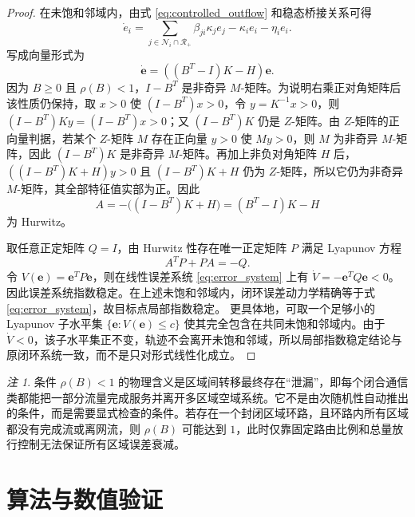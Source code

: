 \documentclass[a4paper,12pt]{article}
\theoremstyle{plain}
\theoremstyle{definition}
\theoremstyle{remark}
\newtheorem{remark}[theorem]{注}
\begin{document}
\begin{proof}
在未饱和邻域内，由式 \eqref{eq:controlled_outflow} 和稳态桥接关系可得
\begin{equation}
    \dot e_i
    =
    \sum_{j\in\mathcal N_i\cap\mathcal R_+}\beta_{ji}\kappa_j e_j-\kappa_i e_i-\eta_i e_i .
\end{equation}
写成向量形式为
\begin{equation}\label{eq:error_system}
    \dot{\bm e}
    =
    \left((B^T-I)K-H\right)\bm e .
\end{equation}
因为 $B\ge0$ 且 $\rho(B)<1$，$I-B^T$ 是非奇异 $M$-矩阵。为说明右乘正对角矩阵后该性质仍保持，取 $x>0$ 使 $(I-B^T)x>0$，令 $y=K^{-1}x>0$，则 $(I-B^T)Ky=(I-B^T)x>0$；又 $(I-B^T)K$ 仍是 $Z$-矩阵。由 $Z$-矩阵的正向量判据，若某个 $Z$-矩阵 $M$ 存在正向量 $y>0$ 使 $My>0$，则 $M$ 为非奇异 $M$-矩阵，因此 $(I-B^T)K$ 是非奇异 $M$-矩阵。再加上非负对角矩阵 $H$ 后，$((I-B^T)K+H)y>0$ 且 $(I-B^T)K+H$ 仍为 $Z$-矩阵，所以它仍为非奇异 $M$-矩阵，其全部特征值实部为正。因此
\[
    A=-\bigl((I-B^T)K+H\bigr)=(B^T-I)K-H
\]
为 Hurwitz。

取任意正定矩阵 $Q=I$，由 Hurwitz 性存在唯一正定矩阵 $P$ 满足 Lyapunov 方程
\begin{equation}
    A^TP+PA=-Q .
\end{equation}
令 $V(\bm e)=\bm e^TP\bm e$，则在线性误差系统 \eqref{eq:error_system} 上有 $\dot V=-\bm e^TQ\bm e<0$。因此误差系统指数稳定。在上述未饱和邻域内，闭环误差动力学精确等于式 \eqref{eq:error_system}，故目标点局部指数稳定。
更具体地，可取一个足够小的 Lyapunov 子水平集 $\{\bm e:V(\bm e)\le c\}$ 使其完全包含在共同未饱和邻域内。由于 $\dot V<0$，该子水平集正不变，轨迹不会离开未饱和邻域，所以局部指数稳定结论与原闭环系统一致，而不是只对形式线性化成立。
\end{proof}

\begin{remark}
条件 $\rho(B)<1$ 的物理含义是区域间转移最终存在“泄漏”，即每个闭合通信类都能把一部分流量完成服务并离开多区域空域系统。它不是由次随机性自动推出的条件，而是需要显式检查的条件。若存在一个封闭区域环路，且环路内所有区域都没有完成流或离网流，则 $\rho(B)$ 可能达到 $1$，此时仅靠固定路由比例和总量放行控制无法保证所有区域误差衰减。
\end{remark}

\section{算法与数值验证}
\end{document}
